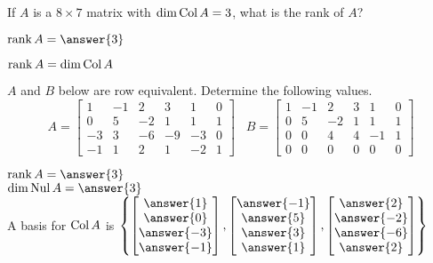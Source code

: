 \documentclass{ximera}
\newcommand{\Col}{\mathop{\rm Col}}
\newcommand{\Nul}{\mathop{\rm Nul}}
\newcommand{\rank}{\mathop{\rm rank}}
\begin{document}
  	  		               \begin{question} If $A$ is  a $8\times 7$ matrix with $\dim \Col A = 3$, what is the rank of $A$?
  	  		               	
  	  		               	$\rank A = \answer{3}$
  	  		               	
  	  		               	\vspace{10pt}
  	  		               	\begin{hint}
  	  		               		$\rank A = \dim \Col A$
  	  		               	\end{hint}
  	  		               \end{question}	
  	  		                 \begin{question} $A$ and $B$ below are row equivalent. Determine the following values.
  	  		                 	$$A = \begin{bmatrix} 1&-1& 2&3&1&0\\ 0&5&-2&1&1&1\\ -3&3&-6&-9&-3&0\\-1&1&2&1&-2&1\end{bmatrix} \hspace{10pt} B = \begin{bmatrix} 1&-1&2&3&1&0\\ 0&5&-2&1&1&1\\ 0&0&4&4&-1&1\\ 0&0&0&0&0&0\end{bmatrix}$$
  	  		                 	
  	  		                 $\rank A = \answer{3}$\\
  	  		                 $\dim \Nul A = \answer{3}$\\
  	  		                 
  	  		                 A basis for $\Col A$ is $\left\{ \begin{bmatrix} \answer{1}\\\answer{0}\\ \answer{-3}\\ \answer{-1}\end{bmatrix},    \begin{bmatrix} \answer{-1}\\\answer{5}\\ \answer{3}\\ \answer{1}\end{bmatrix}, \begin{bmatrix} \answer{2}\\\answer{-2}\\ \answer{-6}\\ \answer{2}\end{bmatrix}    \right\}$
  	  		              
  	  		                 \end{question}
  	  		    
  
\end{document}
